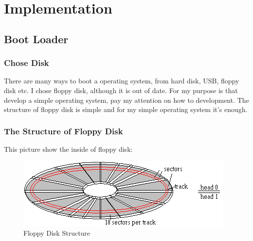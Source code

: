 \documentclass{swfcthesis}
\begin{document}
\begin{center}
\end{center}



\chapter{Implementation}

\section{Boot Loader}

\subsection{Chose Disk}
\label{sec:chose-disk}

There are many ways to boot a operating system, from hard disk, USB, floppy disk etc. I
chose floppy disk, although it is out of date. For my purpose is that develop a simple
operating system, pay my attention on how to development. The structure of floppy disk is
simple and for my simple operating system it's enough.

\subsection{The Structure of Floppy Disk}
\label{sec:struct-floppy-disk}

This picture show the inside of floppy disk:
\begin{figure}[!ht]
  \centering
  \includegraphics[width=.5\textwidth]{flpy1}
  \caption{Floppy Disk Structure}
  \label{fig:flpy1.png}
\end{figure}
\end{document}
